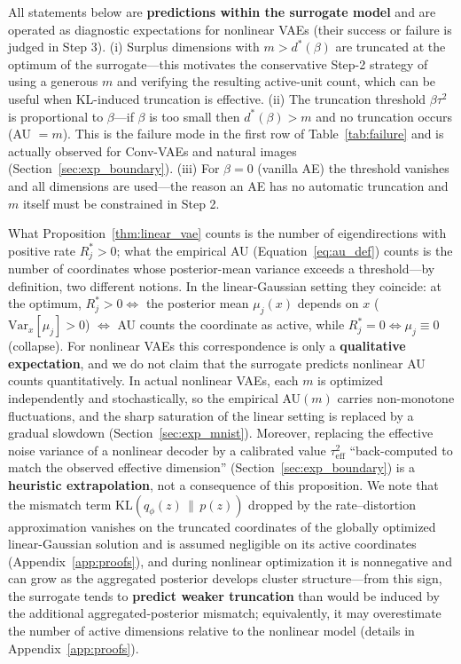 \documentclass[make,article,submit,pdftex,moreauthors]{Definitions/mdpi}
\newcommand{\dstar}{d^{*}(\beta)}
\begin{document}
\begin{Remark}\label{rem:implication}
All statements below are \textbf{predictions within the surrogate model}
and are operated as diagnostic expectations for nonlinear VAEs (their
success or failure is judged in Step 3).
(i) Surplus dimensions with $m > \dstar$ are truncated at the optimum of
the surrogate---this motivates the conservative Step-2 strategy of using a
generous $m$ and verifying the resulting active-unit count, which can be
useful when KL-induced truncation is effective.
(ii) The truncation threshold $\beta\tau^2$ is proportional to $\beta$---if
$\beta$ is too small then $\dstar > m$ and no truncation occurs
(AU $= m$).
This is the failure mode in the first row of Table~\ref{tab:failure} and is
actually observed for Conv-VAEs and natural images
(Section~\ref{sec:exp_boundary}).
(iii) For $\beta = 0$ (vanilla AE) the threshold vanishes and all
dimensions are used---the reason an AE has no automatic truncation and $m$
itself must be constrained in Step 2.
\end{Remark}

\begin{Remark}\label{rem:bridge}
What Proposition~\ref{thm:linear_vae} counts is the number of
eigendirections with positive rate $R_j^* > 0$; what the empirical AU
(Equation~\eqref{eq:au_def}) counts is the number of coordinates whose
posterior-mean variance exceeds a threshold---by definition, two different
notions.
In the linear-Gaussian setting they coincide: at the optimum,
$R_j^* > 0 \iff$ the posterior mean $\mu_j(x)$ depends on $x$
($\mathrm{Var}_x[\mu_j] > 0$) $\iff$ AU counts the coordinate as active,
while $R_j^* = 0 \iff \mu_j \equiv 0$ (collapse).
For nonlinear VAEs this correspondence is only a \textbf{qualitative
expectation}, and we do not claim that the surrogate predicts nonlinear AU
counts quantitatively.
In actual nonlinear VAEs, each $m$ is optimized independently and
stochastically, so the empirical AU$(m)$ carries non-monotone fluctuations,
and the sharp saturation of the linear setting is replaced by a gradual
slowdown (Section~\ref{sec:exp_mnist}).
Moreover, replacing the effective noise variance of a nonlinear decoder by a
calibrated value $\tau^2_{\mathrm{eff}}$ ``back-computed to match the
observed effective dimension'' (Section~\ref{sec:exp_boundary}) is a
\textbf{heuristic extrapolation}, not a consequence of this proposition.
We note that the mismatch term $\mathrm{KL}(q_\phi(z)\,\|\,p(z))$ dropped by
the rate--distortion approximation vanishes on the truncated coordinates of
the globally optimized linear-Gaussian solution and is assumed negligible
on its active coordinates (Appendix~\ref{app:proofs}), and during nonlinear
optimization it is
nonnegative and can grow as the aggregated posterior develops cluster
structure---from this sign, the surrogate tends to \textbf{predict weaker
truncation} than would be induced by the additional aggregated-posterior
mismatch; equivalently, it may overestimate the number of active dimensions
relative to the nonlinear model (details in Appendix~\ref{app:proofs}).
\end{Remark}
\end{document}
